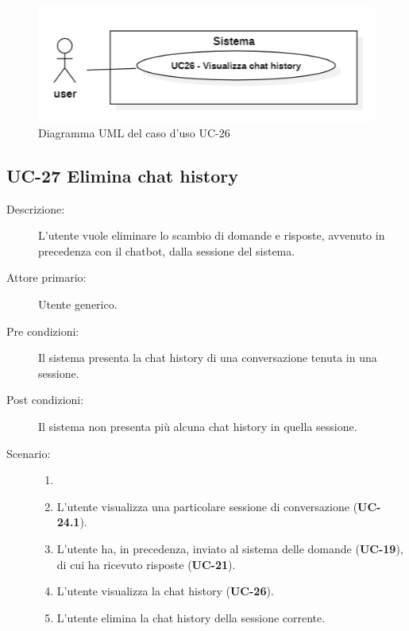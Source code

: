 \begin{figure}[H]
    \centering
    \includegraphics[width=0.9\linewidth]{UC26.PNG}
    \caption{Diagramma UML del caso d'uso UC-26}
    \label{fig:UC28-29}
\end{figure}

\subsection{UC-27 Elimina chat history}
\begin{description}
    \item[Descrizione:] L'utente vuole eliminare lo scambio di domande e risposte, avvenuto in precedenza con il chatbot, dalla sessione del sistema.
    \item[Attore primario:] Utente generico.
    \item[Pre condizioni:] Il sistema presenta la chat history di una conversazione tenuta in una sessione.
    \item[Post condizioni:] Il sistema non presenta più alcuna chat history in quella sessione.
    \item[Scenario:]
    \begin{enumerate}
        \item[]
        \item L'utente visualizza una particolare sessione di conversazione (\textbf{UC-24.1}).
        \item L'utente ha, in precedenza, inviato al sistema delle domande (\textbf{UC-19}), di cui ha ricevuto risposte (\textbf{UC-21}).
        \item L'utente visualizza la chat history (\textbf{UC-26}).
        \item L'utente elimina la chat history della sessione corrente.
    \end{enumerate}
\end{description}

